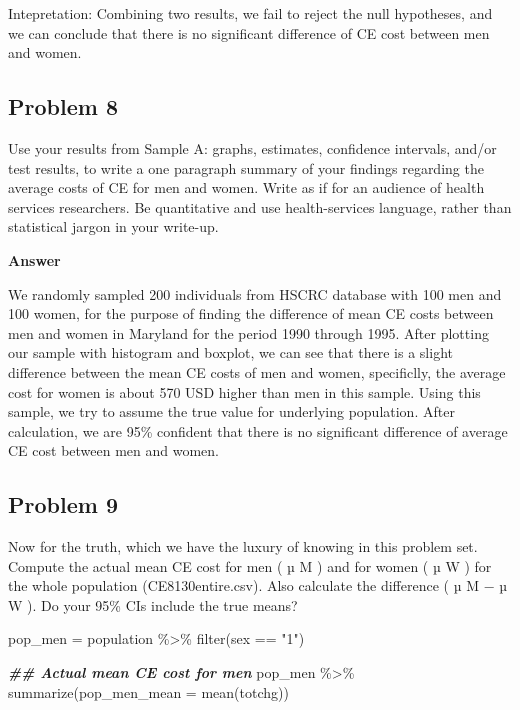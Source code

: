 \documentclass[
]{article}
\newenvironment{Shaded}{\begin{snugshade}}{\end{snugshade}}
\newcommand{\AttributeTok}[1]{\textcolor[rgb]{0.77,0.63,0.00}{#1}}
\newcommand{\DocumentationTok}[1]{\textcolor[rgb]{0.56,0.35,0.01}{\textbf{\textit{#1}}}}
\newcommand{\FunctionTok}[1]{\textcolor[rgb]{0.00,0.00,0.00}{#1}}
\newcommand{\NormalTok}[1]{#1}
\newcommand{\OtherTok}[1]{\textcolor[rgb]{0.56,0.35,0.01}{#1}}
\newcommand{\SpecialCharTok}[1]{\textcolor[rgb]{0.00,0.00,0.00}{#1}}
\newcommand{\StringTok}[1]{\textcolor[rgb]{0.31,0.60,0.02}{#1}}
\begin{document}
Intepretation: Combining two results, we fail to reject the null
hypotheses, and we can conclude that there is no significant difference
of CE cost between men and women.

\hypertarget{problem-8}{%
\subsection{Problem 8}\label{problem-8}}

Use your results from Sample A: graphs, estimates, confidence intervals,
and/or test results, to write a one paragraph summary of your findings
regarding the average costs of CE for men and women. Write as if for an
audience of health services researchers. Be quantitative and use
health-services language, rather than statistical jargon in your
write-up.

\textbf{Answer}

We randomly sampled 200 individuals from HSCRC database with 100 men and
100 women, for the purpose of finding the difference of mean CE costs
between men and women in Maryland for the period 1990 through 1995.
After plotting our sample with histogram and boxplot, we can see that
there is a slight difference between the mean CE costs of men and women,
specificlly, the average cost for women is about 570 USD higher than men
in this sample. Using this sample, we try to assume the true value for
underlying population. After calculation, we are 95\% confident that
there is no significant difference of average CE cost between men and
women.

\hypertarget{problem-9}{%
\subsection{Problem 9}\label{problem-9}}

Now for the truth, which we have the luxury of knowing in this problem
set. Compute the actual mean CE cost for men ( µ M ) and for women ( µ W
) for the whole population (CE8130entire.csv). Also calculate the
difference ( µ M − µ W ). Do your 95\% CIs include the true means?

\begin{Shaded}
\begin{Highlighting}[]
\NormalTok{pop\_men }\OtherTok{=} 
\NormalTok{population }\SpecialCharTok{\%\textgreater{}\%} 
  \FunctionTok{filter}\NormalTok{(sex }\SpecialCharTok{==} \StringTok{"1"}\NormalTok{)}

\DocumentationTok{\#\# Actual mean CE cost for men}
\NormalTok{pop\_men }\SpecialCharTok{\%\textgreater{}\%} 
  \FunctionTok{summarize}\NormalTok{(}\AttributeTok{pop\_men\_mean =} \FunctionTok{mean}\NormalTok{(totchg))}
\end{Highlighting}
\end{Shaded}
\end{document}
